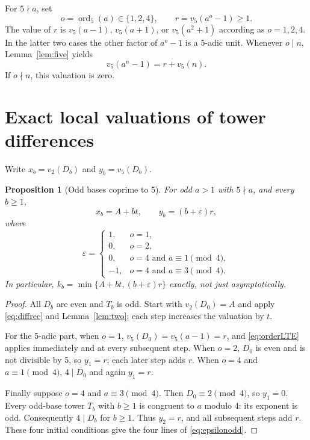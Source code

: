 \documentclass[11pt,letterpaper]{article}
\numberwithin{equation}{section}
\newtheorem{proposition}[theorem]{Proposition}
\theoremstyle{definition}
\newcommand{\ord}{\operatorname{ord}}
\begin{document}
For $5\nmid a$, set
\begin{equation}\label{eq:or}
 o=\ord_5(a)\in\{1,2,4\},\qquad r=v_5(a^o-1)\geq1.
\end{equation}
The value of $r$ is $v_5(a-1)$, $v_5(a+1)$, or $v_5(a^2+1)$ according as
$o=1,2,4$. In the latter two cases the other factor of $a^o-1$ is a 5-adic unit.
Whenever $o\mid n$, Lemma~\ref{lem:five} yields
\begin{equation}\label{eq:orderLTE}
 v_5(a^n-1)=r+v_5(n).
\end{equation}
If $o\nmid n$, this valuation is zero.

\section{Exact local valuations of tower differences}\label{sec:valuations}
Write $x_b=v_2(D_b)$ and $y_b=v_5(D_b)$.

\begin{proposition}[Odd bases coprime to 5]\label{prop:oddprofiles}
For odd $a>1$ with $5\nmid a$, and every $b\geq1$,
\begin{equation}\label{eq:oddprofiles}
 x_b=A+bt,\qquad y_b=(b+\varepsilon)r,
\end{equation}
where
\begin{equation}\label{eq:epsilonodd}
\varepsilon=\begin{cases}
 1,&o=1,\\
 0,&o=2,\\
 0,&o=4\text{ and }a\equiv1\pmod4,\\
 -1,&o=4\text{ and }a\equiv3\pmod4.
\end{cases}
\end{equation}
In particular, $k_b=\min\{A+bt,(b+\varepsilon)r\}$ exactly, not just
asymptotically.
\end{proposition}
\begin{proof}
All $D_b$ are even and $T_b$ is odd. Start with $v_2(D_0)=A$ and apply
\eqref{eq:diffrec} and Lemma~\ref{lem:two}; each step increases the valuation
by $t$.

For the 5-adic part, when $o=1$, $v_5(D_0)=v_5(a-1)=r$, and
\eqref{eq:orderLTE} applies immediately and at every subsequent step.
When $o=2$, $D_0$ is even and is not divisible by 5, so $y_1=r$; each later
step adds $r$. When $o=4$ and $a\equiv1\pmod4$, $4\mid D_0$ and again
$y_1=r$.

Finally suppose $o=4$ and $a\equiv3\pmod4$. Then $D_0\equiv2\pmod4$, so
$y_1=0$. Every odd-base tower $T_b$ with $b\geq1$ is congruent to $a$ modulo 4:
its exponent is odd. Consequently $4\mid D_b$ for $b\geq1$. Thus $y_2=r$,
and all subsequent steps add $r$. These four initial conditions give the four
lines of \eqref{eq:epsilonodd}.
\end{proof}
\end{document}

